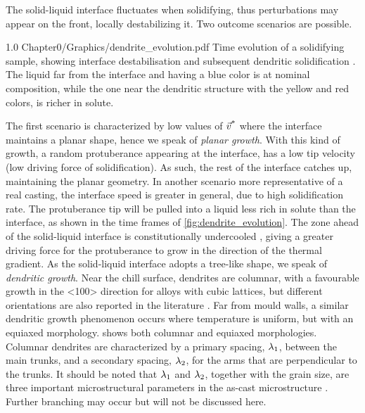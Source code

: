 The solid-liquid interface fluctuates when solidifying, thus perturbations may appear on the front, locally destabilizing it. 
Two outcome scenarios are possible.
\begin{figureth}
{1.0}
{Chapter0/Graphics/dendrite_evolution.pdf}
{Time evolution of a solidifying  sample, showing interface destabilisation and subsequent dendritic solidification \citep{buffet_measurement_2010}.
The liquid far from the interface and having a blue color is at nominal composition, while the one near the dendritic structure with the yellow and red colors, is richer in solute.}
\label{fig:dendrite_evolution}
\end{figureth}
%
The first scenario is characterized by low values of $\vec{v}^\text{*}$ where the interface maintains a planar shape, hence we speak of \emph{planar growth}. 
With this kind of growth, a random protuberance appearing at the interface, has a low tip velocity (low driving force of solidification). As such,
the rest of the interface catches up, maintaining the planar geometry.
In another scenario more representative of a real casting, the interface speed is greater in general, due to high solidification rate.
The protuberance tip will be pulled into a liquid less rich in solute than the interface, as shown in the time frames of \cref{fig:dendrite_evolution}.
The zone ahead of the solid-liquid interface is constitutionally undercooled \citep{tiller_redistribution_1953}, 
giving a greater driving force for the protuberance to grow in the direction
of the thermal gradient. As the solid-liquid interface adopts a tree-like shape, we speak of \emph{dendritic growth}. Near the chill surface, dendrites are columnar, with a 
favourable growth in the <100> direction for alloys with cubic lattices, but different orientations are also reported in the literature \citep[see][289]{dantzig_solidification_2009}.
Far from mould walls, a similar dendritic growth phenomenon occurs where temperature is uniform, but with an equiaxed morphology.
 shows both columnar and equiaxed morphologies. Columnar dendrites are characterized by a primary spacing, 
${\lambda}_{1}$, between the main trunks, and a secondary spacing, ${\lambda}_{2}$, for the arms that are perpendicular
to the trunks. It should be noted that ${\lambda}_{1}$ and ${\lambda}_{2}$, together with the grain size, are three important 
microstructural parameters in the as-cast microstructure \citep{easton_grain_2011}.
Further branching may occur but will not be discussed here.
